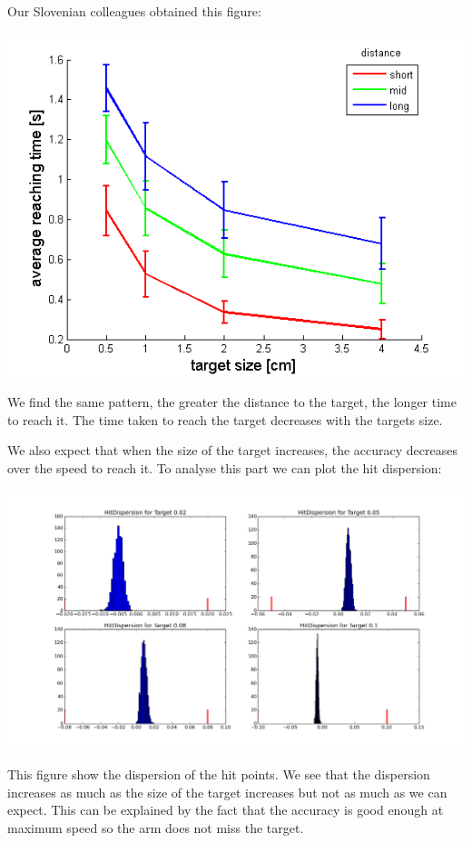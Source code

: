 \documentclass[pdftex,a4paper,11pt]{report}
\begin{document}
Our Slovenian colleagues obtained this figure:
\begin{center}
\includegraphics[scale=0.7]{figures/timeLuka.png}
\end{center}
We find the same pattern, the greater the distance to the target, the longer time to reach it. The time taken to reach the target decreases with the targets size.


We also expect that when the size of the target increases, the accuracy decreases over the speed to reach it.
To analyse this part we can plot the hit dispersion:
\begin{center}
\includegraphics[scale=0.3]{figures/hitDispAll0p1_0p4175.png}
\end{center}
This figure show the dispersion of the hit points. We see that the dispersion increases as much as the size of the target increases but not as much as we can expect.
This can be explained by the fact that the accuracy is good enough at maximum speed so the arm does not miss the target.
\end{document}

